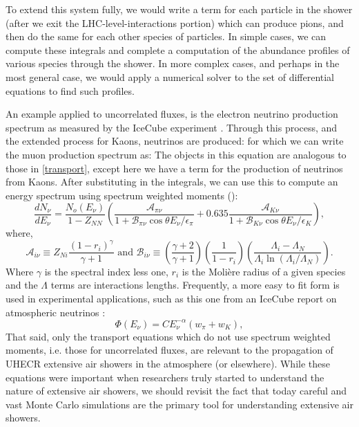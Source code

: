 To extend this system fully, we would write a term for each particle in the shower (after we exit the LHC-level-interactions portion) which can produce pions, and then do the same for each other species of particles. In simple cases, we can compute these integrals and complete a computation of the abundance profiles of various species through the shower. In more complex cases, and perhaps in the most general case, we would apply a numerical solver to the set of differential equations to find such profiles.

An example applied to uncorrelated fluxes, is the electron neutrino production spectrum as measured by the IceCube experiment \cite{atmos}.  Through this process, and the extended process for Kaons, neutrinos are produced:
for which we can write the muon production spectrum as:
The objects in this equation are analogous to those in \autoref{transport}, except here we have a term for the production of neutrinos from Kaons. After substituting in the integrals, we can use this to compute an energy spectrum using spectrum weighted moments (\cite{crapp}):
$$
\label{thespec}
\frac{dN_\nu}{dE_\nu}=\frac{N_o(E_\nu)}{1-Z_{NN}} \left(\frac{\mathcal{A}_{\pi\nu}}{1+\mathcal{B}_{\pi \nu}\cos{\theta}E_\nu / \epsilon_\pi} +0.635 \frac{\mathcal{A}_{K\nu}}{1+\mathcal{B}_{K \nu}\cos{\theta}E_\nu / \epsilon_K} \right),         
$$
where,
$$
\mathcal{A}_{i\nu}\equiv Z_{Ni}\frac{(1-r_i)^\gamma}{\gamma+1} \mbox{   and   } \mathcal{B}_{i\nu}\equiv \left(\frac{\gamma+2}{\gamma+1} \right) \left(\frac{1}{1-r_i} \right) \left(\frac{\Lambda_i-\Lambda_N}{\Lambda_i \ln(\Lambda_i/\Lambda_N)} \right).
$$
Where $\gamma$ is the spectral index less one, $r_i$ is the Moli\`{e}re radius of a given species and the $\Lambda$ terms are interactions lengths.
Frequently, a more easy to fit form is used in experimental applications, such as this one from an IceCube report on atmospheric neutrinos \cite{atmos}:
$$
\Phi(E_\nu)=C E_\nu^{-\alpha}(w_\pi+w_K),
$$
That said, only the transport equations which do not use spectrum weighted moments, i.e. those for uncorrelated fluxes, are relevant to the propagation of UHECR extensive air showers in the atmosphere (or elsewhere). While these equations were important when researchers truly started to understand the nature of extensive air showers, we should revisit the fact that today careful and vast Monte Carlo simulations are the primary tool for understanding extensive air showers.
